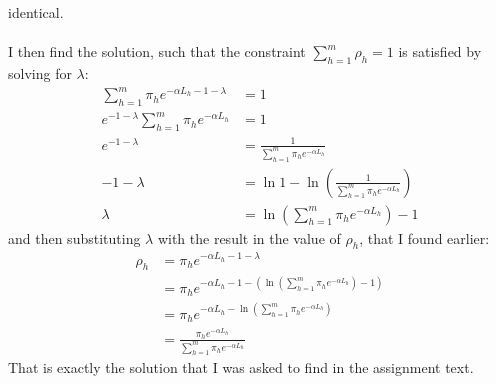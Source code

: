 \documentclass[a4paper]{article}
\begin{document}
identical. \\\\
I then find the solution, such that the constraint $\sum_{h=1}^m \rho_h = 1$ is
satisfied by solving for $\lambda$:
\begin{align*}
  \sum_{h=1}^m\pi_{h}e^{-\alpha L_{h} - 1 - \lambda} &= 1\\
  e^{ - 1 - \lambda}\sum_{h=1}^m\pi_{h}e^{-\alpha L_{h}} &= 1\\
  e^{ - 1 - \lambda} &= \frac{1}{\sum_{h=1}^m\pi_{h}e^{-\alpha L_{h}}}\\
  - 1 - \lambda &= \ln{1} - \ln\left(\frac{1}{\sum_{h=1}^m\pi_{h}e^{-\alpha L_{h}}} \right)\\
  \lambda &= \ln\left(\sum_{h=1}^m\pi_{h}e^{-\alpha L_{h}}\right) - 1
\end{align*}
and then substituting $\lambda$ with the result in the value of $\rho_h$, that I found earlier:
\begin{align*}
  \rho_{h} &= \pi_{h}e^{-\alpha L_{h} - 1 - \lambda} \\
  &= \pi_{h}e^{-\alpha L_{h} - 1 - (\ln\left(\sum_{h=1}^m\pi_{h}e^{-\alpha L_{h}}\right) - 1)} \\
  &= \pi_{h}e^{-\alpha L_{h} - \ln\left(\sum_{h=1}^m\pi_{h}e^{-\alpha L_{h}}\right)} \\
  &= \frac{\pi_{h}e^{-\alpha L_{h}}}{\sum_{h=1}^m\pi_{h}e^{-\alpha L_{h}}}
\end{align*}
That is exactly the solution that I was asked to find in the assignment text.
\end{document}
